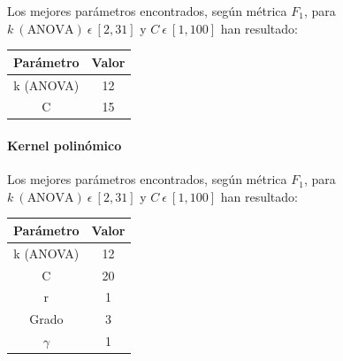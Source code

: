 Los mejores parámetros encontrados, según métrica $F_{1}$, para $k\:(\mbox{ANOVA})\:\epsilon\:[2,31]$ y $C\:\epsilon\:[1,100]$ han resultado:

\begin{table}[H]
	\begin{tabular}{|c|c|}
		\hline
		Parámetro & Valor \\ \hline
		k (ANOVA) & 12 \\ \hline
		C & 15\\ \hline
	\end{tabular}
\end{table}

\paragraph{Kernel polinómico}

Los mejores parámetros encontrados, según métrica $F_{1}$, para $k\:(\mbox{ANOVA})\:\epsilon\:[2,31]$ y $C\:\epsilon\:[1,100]$ han resultado:

\begin{table}[H]
	\begin{tabular}{|c|c|}
		\hline
		Parámetro & Valor \\ \hline
		k (ANOVA) & 12 \\ \hline
		C & 20\\ \hline
		r & 1 \\ \hline
		Grado & 3 \\ \hline
		$\gamma$ & 1 \\ \hline
	\end{tabular}
\end{table}

